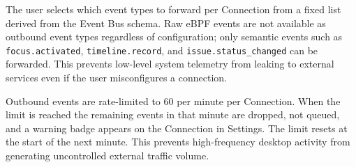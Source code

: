 The user selects which event types to forward per Connection from a fixed list
derived from the Event Bus schema. Raw eBPF events are not available as
outbound event types regardless of configuration; only semantic events such as
\texttt{focus.activated}, \texttt{timeline.record}, and
\texttt{issue.status\_changed} can be forwarded. This prevents low-level
system telemetry from leaking to external services even if the user
misconfigures a connection.

Outbound events are rate-limited to 60 per minute per Connection. When the
limit is reached the remaining events in that minute are dropped, not queued,
and a warning badge appears on the Connection in Settings. The limit resets
at the start of the next minute. This prevents high-frequency desktop activity
from generating uncontrolled external traffic volume.
